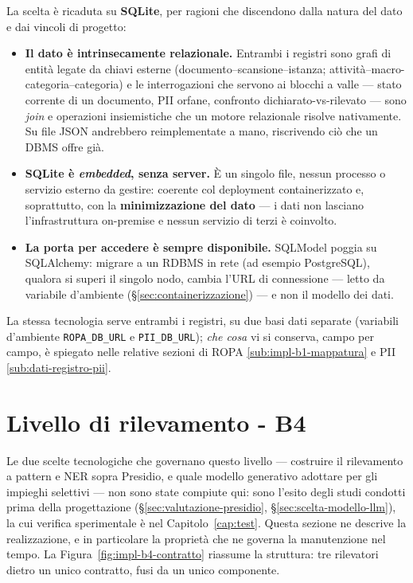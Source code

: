 La scelta è ricaduta su \textbf{SQLite}, per ragioni che discendono dalla natura del dato e dai vincoli di progetto:
\begin{itemize}
	\item \textbf{Il dato è intrinsecamente relazionale.} Entrambi i registri sono grafi di entità legate da chiavi esterne (documento--scansione--istanza; attività--macro-categoria--categoria) e le interrogazioni che servono ai blocchi a valle --- stato corrente di un documento, PII orfane, confronto dichiarato-vs-rilevato --- sono \textit{join} e operazioni insiemistiche che un motore relazionale risolve nativamente. Su file JSON andrebbero reimplementate a mano, riscrivendo ciò che un DBMS offre già.
	\item \textbf{SQLite è \emph{embedded}, senza server.} È un singolo file, nessun processo o servizio esterno da gestire: coerente col deployment containerizzato e, soprattutto, con la \textbf{minimizzazione del dato} --- i dati non lasciano l'infrastruttura on-premise e nessun servizio di terzi è coinvolto.
	\item \textbf{La porta per accedere è sempre disponibile.} SQLModel poggia su SQLAlchemy: migrare a un RDBMS in rete (ad esempio PostgreSQL), qualora si superi il singolo nodo, cambia l'URL di connessione --- letto da variabile d'ambiente (§\ref{sec:containerizzazione}) --- e non il modello dei dati.
\end{itemize}

La stessa tecnologia serve entrambi i registri, su due basi dati separate (variabili d'ambiente \texttt{ROPA\_DB\_URL} e \texttt{PII\_DB\_URL}); \emph{che cosa} vi si conserva, campo per campo, è spiegato nelle relative sezioni di ROPA \ref{sub:impl-b1-mappatura} e PII \ref{sub:dati-registro-pii}.

\section{Livello di rilevamento - B4}
\label{sec:impl-detection}

Le due scelte tecnologiche che governano questo livello --- costruire il rilevamento a pattern e NER sopra Presidio, e quale modello generativo adottare per gli impieghi selettivi --- non sono state compiute qui: sono l'esito degli studi condotti prima della progettazione (§\ref{sec:valutazione-presidio}, §\ref{sec:scelta-modello-llm}), la cui verifica sperimentale è nel Capitolo~\ref{cap:test}. Questa sezione ne descrive la realizzazione, e in particolare la proprietà che ne governa la manutenzione nel tempo. La Figura~\ref{fig:impl-b4-contratto} riassume la struttura: tre rilevatori dietro un unico contratto, fusi da un unico componente.

